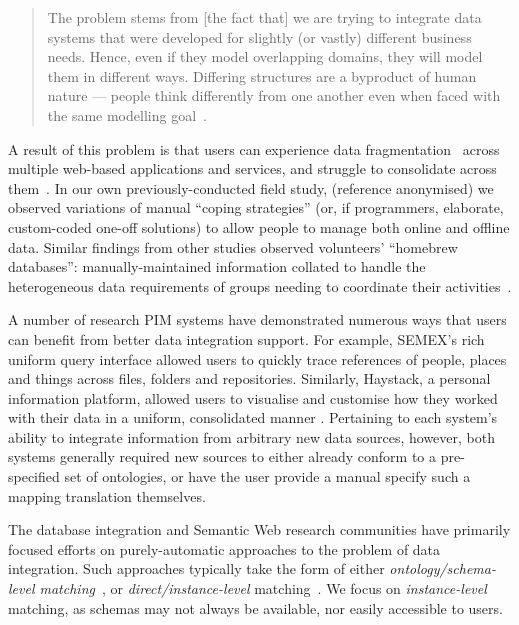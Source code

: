 \documentclass{sigchi}
\begin{document}
\begin{quote} 
The problem stems from [the fact that] we are trying to integrate data systems that were developed for slightly (or vastly) different business needs. Hence, even if they model overlapping domains, they will model them in different ways. Differing structures are a byproduct of human nature --- people think differently from one another even when faced with the same modelling goal~\cite{halevy2006data}.
\end{quote}

A result of this problem is that users can experience data fragmentation~\cite{Jones05towardsa} across multiple web-based applications and services, and struggle to consolidate across them~\cite{bergman,boardmansasse}.  In our own previously-conducted field study, (reference anonymised) we observed variations of manual ``coping strategies'' (or, if programmers, elaborate, custom-coded one-off solutions) to allow people to manage both online and offline data.  Similar findings from other studies observed volunteers' ``homebrew databases'': manually-maintained information collated to handle the heterogeneous data requirements of groups needing to coordinate their activities~\cite{Voida:2011:HDC:1978942.1979078}.

A number of research PIM systems have demonstrated numerous ways that users can benefit from better data integration support.  For example, SEMEX's \cite{semex} rich uniform query interface allowed users to quickly trace references of people, places and things across files, folders and repositories.  Similarly, Haystack, a personal information platform, allowed users to visualise and customise how they worked with their data in a uniform, consolidated manner \cite{haystack}. Pertaining to each system's ability to integrate information from arbitrary new data sources, however, both systems generally required new sources to either already conform to a pre-specified set of ontologies, or have the user provide a manual specify such a mapping translation themselves.

The database integration and Semantic Web \cite{Shadbolt:2006:SWR:1155313.1155373} research communities have primarily focused efforts on purely-automatic approaches to the problem of data integration.  Such approaches typically take the form of either \emph{ontology/schema-level matching}~\cite{euzenat2004api,doan2003learning}, or \emph{direct/instance-level} matching~\cite{suchanek2011paris,castano2006matching}.  We focus on \emph{instance-level} matching, as schemas may not always be available, nor easily accessible to users. 
\end{document}
